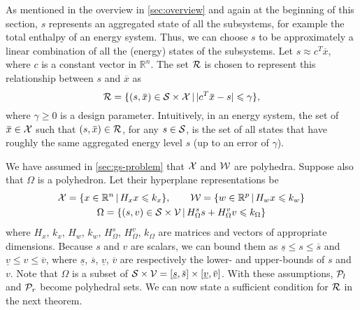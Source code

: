 As mentioned in the overview in \cref{sec:overview} and again at the beginning of this section, $s$ represents an aggregated state of all the subsystems, for example the total enthalpy of an energy system.
Thus, we can choose $s$ to be approximately a linear combination of all the (energy) states of the subsystems.
Let $s \approx c^{T} \overbar{x}$, where $c$ is a constant vector in $\mathbb{R}^{n}$.
The set $\mathcal{R}$ is chosen to represent this relationship between $s$ and $\overbar{x}$ as 
\begin{equation}
  \label{eq:abstraction-gs:R}
  \RSet = \{ (s,\overbar{x}) \in \SSet \times \XSet \,|\, | c^{T} \overbar{x} - s | \leqslant \gamma \} \text,
\end{equation}
where $\gamma \geqslant 0$ is a design parameter.
Intuitively, in an energy system, the set of $\overbar{x} \in \XSet$ such that $(s,\overbar{x}) \in \RSet$, for any $s \in \mathcal{S}$, is the set of all states that have roughly the same aggregated energy level $s$ (up to an error of $\gamma$).

We have assumed in \cref{sec:gs-problem} that $\mathcal{X}$ and $\mathcal{W}$ are polyhedra.
Suppose also that $\Omega$ is a polyhedron.
Let their hyperplane representations be
\begin{gather*}
  \mathcal{X} = \{ x \in \mathbb{R}^{n} \,|\, H_{x} x \leqslant k_{x} \}, \qquad
  \mathcal{W} = \{ w \in \mathbb{R}^{p} \,|\, H_{w} x \leqslant k_{w} \}\\
  \Omega = \{ (s,v) \in \mathcal{S} \times \mathcal{V} \,|\, H_{\Omega}^{s} s + H_{\Omega}^{v} v \leqslant k_{\Omega} \}
\end{gather*}
where $H_{x}$, $k_{x}$, $H_{w}$, $k_{w}$, $H_{\Omega}^{s}$, $H_{\Omega}^{v}$, $k_{\Omega}$ are matrices and vectors of appropriate dimensions.
Because $s$ and $v$ are scalars, we can bound them as $\underline{s} \leqslant s \leqslant \overbar{s}$ and $\underline{v} \leqslant v \leqslant \overbar{v}$, where $\underline{s}$, $\overbar{s}$, $\underline{v}$, $\overbar{v}$ are respectively the lower- and upper-bounds of $s$ and $v$.
Note that $\Omega$ is a subset of $\SSet \times \VSet = [\underline{s},\overbar{s}] \times [\underline{v},\overbar{v}]$.
With these assumptions, $\mathcal{P}_{l}$ and $\mathcal{P}_{r}$ become polyhedral sets.
We can now state a sufficient condition for $\mathcal{R}$ in the next theorem.

